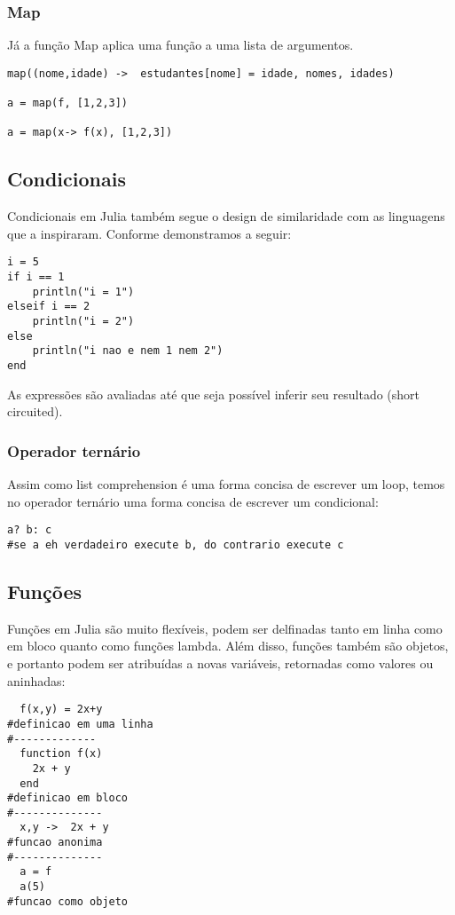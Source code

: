 \subsubsection{Map}
Já a função Map aplica uma função a uma lista de argumentos.
\begin{lstlisting}
map((nome,idade) ->  estudantes[nome] = idade, nomes, idades)

a = map(f, [1,2,3]) 

a = map(x-> f(x), [1,2,3])
\end{lstlisting}

\subsection{Condicionais}
Condicionais em Julia também segue o design de similaridade com as linguagens que a inspiraram. Conforme demonstramos a seguir:
\begin{lstlisting}
i = 5
if i == 1 
	println("i = 1")
elseif i == 2
	println("i = 2")
else 
	println("i nao e nem 1 nem 2")
end
\end{lstlisting}

As expressões são avaliadas até que seja possível inferir seu resultado (short circuited).%
\subsubsection{Operador ternário}
Assim como list comprehension é uma forma concisa de escrever um loop, temos no operador ternário uma forma concisa de escrever um condicional:
\begin{lstlisting}
a? b: c
#se a eh verdadeiro execute b, do contrario execute c
\end{lstlisting}

\subsection{Funções}
Funções em Julia são muito flexíveis, podem ser delfinadas tanto em linha como em bloco quanto como funções lambda. Além disso, funções também são objetos, e portanto podem ser atribuídas a novas variáveis, retornadas como valores ou aninhadas:
\begin{lstlisting}
  f(x,y) = 2x+y
#definicao em uma linha
#-------------
  function f(x) 
  	2x + y 
  end
#definicao em bloco
#--------------
  x,y ->  2x + y
#funcao anonima
#--------------
  a = f
  a(5)
#funcao como objeto
\end{lstlisting}

